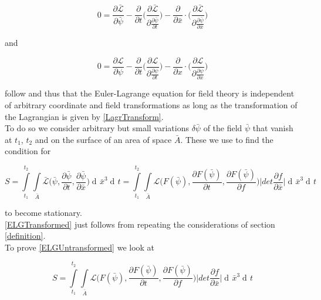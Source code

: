 \documentclass{article}
\DeclareMathOperator{\dd}{d\!}
\begin{document}
\begin{equation} \label{ELGTransformed}
0 = \frac{\partial \bar{\mathcal{L}}}{\partial \bar{\psi}}
-\frac{\partial}{\partial t} \bigg( \frac{\partial \mathcal{\bar{L}}}{\partial \frac{\partial \bar{\psi}}{\partial t}} \bigg) 
-\frac{\partial}{\partial \bar{x}} \cdot \bigg( \frac{\partial \mathcal{\bar{L}}}{\partial \frac{\partial \bar{\psi}}{\partial \bar{x}}} \bigg) 
\end{equation}

and

\begin{equation} \label{ELGUntransformed}
0 = \frac{\partial \mathcal{L}}{\partial \psi}
-\frac{\partial}{\partial t} \bigg( \frac{\partial \mathcal{L}}{\partial \frac{\partial \psi}{\partial t}} \bigg) 
-\frac{\partial}{\partial x} \cdot \bigg( \frac{\partial \mathcal{L}}{\partial \frac{\partial \psi}{\partial x}} \bigg) 
\end{equation}

follow and thus that the Euler-Lagrange equation for field theory is independent of arbitrary coordinate and field transformations as long as the transformation of the Lagrangian is given by \ref{LagrTransform}. \\

To do so we consider arbitrary but small variations $\delta \bar{\psi}$ of the field $\bar{\psi}$ that vanish at $t_1$, $t_2$ and on the surface of an area of space $\bar{A}$. These we use to find the condition for  

\begin{equation}
S = \int\limits_{t_1}^{t_2} \int\limits_{\bar{A}} \bar{\mathcal{L}}\bigg(\bar{\psi}, \frac{\partial \bar{\psi}}{\partial t}, \frac{\partial \bar{\psi}}{\partial \bar{x}}\bigg) \dd \bar{x}^3 \dd t 
= \int\limits_{t_1}^{t_2} \int\limits_{\bar{A}} \mathcal{L}\bigg(F(\bar{\psi}), \frac{\partial F(\bar{\psi})}{\partial t}, \frac{\partial F(\bar{\psi})}{\partial f}\bigg) 
\bigg| det \frac{\partial f}{\partial \bar{x}} \bigg| \dd \bar{x}^3 \dd t 
\end{equation}

to become stationary.\\

\ref{ELGTransformed} just follows from repeating the considerations of section \ref{definition}. \\

To prove \ref{ELGUntransformed} we look at 

\begin{equation}
S = \int\limits_{t_1}^{t_2} \int\limits_{\bar{A}} \mathcal{L}\bigg(F(\bar{\psi}), \frac{\partial F(\bar{\psi})}{\partial t}, \frac{\partial F(\bar{\psi})}{\partial f}\bigg) 
\bigg| det \frac{\partial f}{\partial \bar{x}} \bigg| \dd \bar{x}^3 \dd t 
\end{equation}
\end{document}

